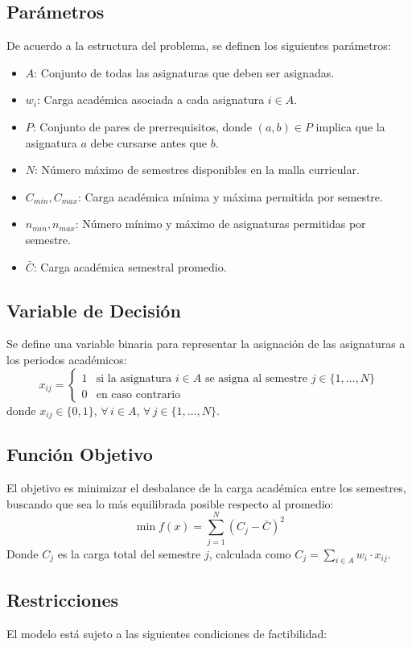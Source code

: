 \documentclass[letter, 10pt]{article}
\begin{document}
\subsection{Par\'{a}metros}
De acuerdo a la estructura del problema, se definen los siguientes par\'{a}metros:
\begin{itemize}
    \item $A$: Conjunto de todas las asignaturas que deben ser asignadas.
    \item $w_i$: Carga acad\'{e}mica asociada a cada asignatura $i \in A$.
    \item $P$: Conjunto de pares de prerrequisitos, donde $(a, b) \in P$ implica que la asignatura $a$ debe cursarse antes que $b$.
    \item $N$: N\'{u}mero m\'{a}ximo de semestres disponibles en la malla curricular.
    \item $C_{min}, C_{max}$: Carga acad\'{e}mica m\'{i}nima y m\'{a}xima permitida por semestre.
    \item $n_{min}, n_{max}$: N\'{u}mero m\'{i}nimo y m\'{a}ximo de asignaturas permitidas por semestre.
    \item $\bar{C}$: Carga acad\'{e}mica semestral promedio.
\end{itemize}

\subsection{Variable de Decisi\'{o}n}
Se define una variable binaria para representar la asignaci\'on 
de las asignaturas a los periodos acad\'emicos:
$$x_{ij} = \begin{cases} 1 & \text{si la asignatura } i \in A 
\text{ se asigna al semestre } j \in \{1, \dots, N\} \\ 
0 & \text{en caso contrario} \end{cases}$$
donde $x_{ij} \in \{0, 1\}$, $\forall\, i \in A$, 
$\forall\, j \in \{1, \dots, N\}$.

\subsection{Funci\'{o}n Objetivo}
El objetivo es minimizar el desbalance de la carga acad\'{e}mica entre los semestres, buscando que sea lo m\'{a}s equilibrada posible respecto al promedio:
$$\min f(x) = \sum_{j=1}^{N} (C_j - \bar{C})^2$$
Donde $C_j$ es la carga total del semestre $j$, calculada como $C_j = \sum_{i \in A} w_i \cdot x_{ij}$.

\subsection{Restricciones}
El modelo est\'{a} sujeto a las siguientes condiciones de factibilidad:
\end{document}

